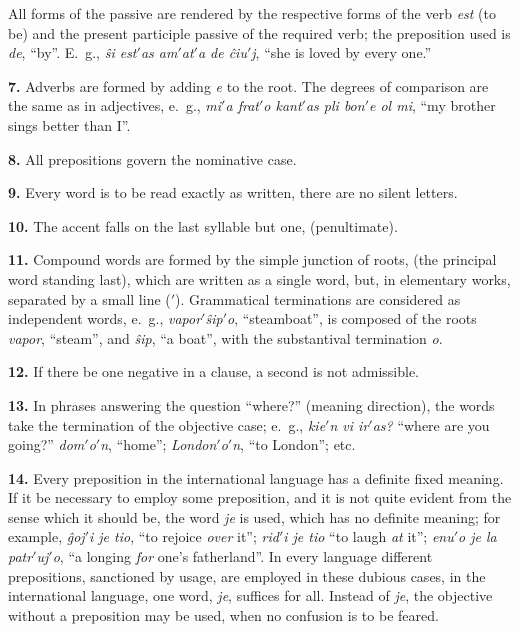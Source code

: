 All forms of the passive are rendered by the respective forms of the verb \emph{est} (to be) and the present participle passive of the required verb; the preposition used is \emph{de}, “by”. E.~g., \emph{ŝi est$'$as am$'$at$'$a de ĉiu$'$j}, “she is loved by every one.”

\textbf{7.} Adverbs are formed by adding \emph{e} to the root. The degrees of comparison are the same as in adjectives, e.~g., \emph{mi$'$a frat$'$o kant$'$as pli bon$'$e ol mi}, “my brother sings better than I”.

\textbf{8.} All prepositions govern the nominative case.

\begin{center}
\large {}
\end{center}

\textbf{9.} Every word is to be read exactly as written, there are no silent letters.

\textbf{10.} The accent falls on the last syllable but one, (penultimate).

\textbf{11.} Compound words are formed by the simple junction of roots, (the principal word standing last), which are written as a single word, but, in elementary works, separated by a small line ($'$). Grammatical terminations are considered as independent words, e.~g., \emph{vapor$'$ŝip$'$o}, “steamboat”, is composed of the roots \emph{vapor}, “steam”, and \emph{ŝip}, “a boat”, with the substantival termination \emph{o}.

\textbf{12.} If there be one negative in a clause, a second is not admissible.

\textbf{13.} In phrases answering the question “where?” (meaning direction), the words take the termination of the objective case; e.~g., \emph{kie$'$n vi ir$'$as?} “where are you going?” \emph{dom$'$o$'$n}, “home”; \emph{London$'$o$'$n}, “to London”; etc.

\textbf{14.} Every preposition in the international language has a definite fixed meaning. If it be necessary to employ some preposition, and it is not quite evident from the sense which it should be, the word \emph{je} is used, which has no definite meaning; for example, \emph{ĝoj$'$i je tio}, “to rejoice \emph{over} it”; \emph{rid$'$i je tio} “to laugh \emph{at} it”; \emph{enu$'$o je la patr$'$uj$'$o}, “a longing \emph{for} one’s fatherland”. In every language different prepositions, sanctioned by usage, are employed in these dubious cases, in the international language, one word, \emph{je}, suffices for all. Instead of \emph{je}, the objective without a preposition may be used, when no confusion is to be feared.

